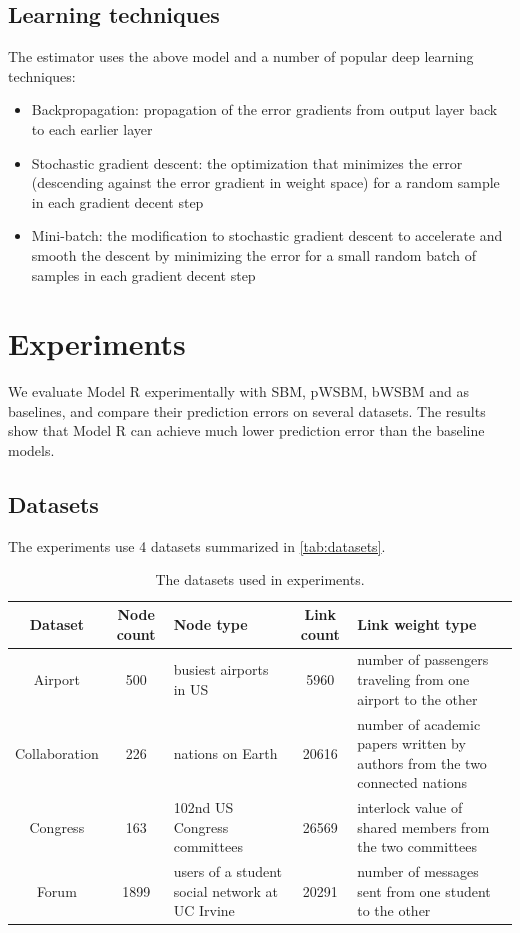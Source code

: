 \documentclass[letterpaper]{article}
\begin{document}
\subsection{Learning techniques}
The estimator uses the above model and a number of popular deep learning 
techniques:
\begin{itemize}
	\item Backpropagation: propagation of the error gradients from output layer 
	back to each earlier layer \cite{rumelhart1988learning}
	\item Stochastic gradient descent: the optimization that minimizes 
	the error (descending against the error gradient in weight space) for a 
	random sample in each gradient decent step \cite{lecun2012efficient}
	\item Mini-batch: the modification to stochastic gradient descent to 
	accelerate and smooth the descent by minimizing the error for a small 
	random batch of samples in each gradient decent step \cite{mairal2010online}
\end{itemize}

\section{Experiments}
We evaluate Model R experimentally with SBM, pWSBM, bWSBM and as baselines,
and compare their prediction errors on several datasets.
The results show 
that Model R can achieve much lower prediction error than the baseline models.

\subsection{Datasets}
The experiments use 4 datasets summarized in \autoref{tab:datasets}.
\begin{table}[!htb]\centering
	\caption{The datasets used in experiments.}
	\begin{tabularx}{\textwidth}{|c|c|X|c|X|}  \hline \rowcolor{blue!50}
		Dataset & Node count & Node type & Link count & Link weight type \\ \hline
		Airport\cite{colizza2007reaction} & 500 & busiest airports in US & 5960 & number of passengers traveling from one airport to the other\\ \hline
		Collaboration\cite{pan2012world} & 226 & nations on Earth & 20616 & number of academic papers written by authors from the two connected nations \\ \hline
		Congress\cite{porter2005network} & 163  & 102nd US Congress committees & 26569 & interlock value of shared members from the two committees \\ \hline
		Forum\cite{opsahl2009clustering}  & 1899 & users of a student social network at UC Irvine & 20291 & number of messages sent from one student to the other \\ \hline
	\end{tabularx}
	\label{tab:datasets}
\end{table}
\end{document}
